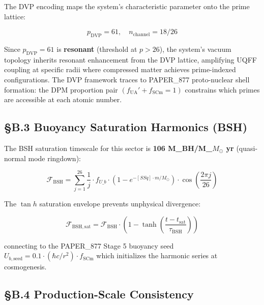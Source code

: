 \documentclass[12pt,a4paper]{article}
\begin{document}
The DVP encoding maps the system's characteristic parameter onto the prime lattice:

\begin{equation}
p_{\mathrm{DVP}} = 61, \quad n_{\mathrm{channel}} = 18/26
\end{equation}

Since $p_{\mathrm{DVP}} = 61$ is \textbf{resonant} (threshold at $p > 26$), the system's vacuum topology inherits resonant enhancement from the DVP lattice, amplifying UQFF coupling at specific radii where compressed matter achieves prime-indexed configurations. The DVP framework traces to PAPER\_877 proto-nuclear shell formation: the DPM proportion pair $(f_{\mathrm{UA}}' + f_{\mathrm{SCm}} = 1)$ constrains which primes are accessible at each atomic number.

\subsection{\S{}B.3 Buoyancy Saturation Harmonics (BSH)}

The BSH saturation timescale for this sector is \textbf{106 M\_BH/M\_{$M_{\odot}$} yr} (quasi-normal mode ringdown):

\begin{equation}
\mathcal{F}_{\mathrm{BSH}} = \sum_{j=1}^{26} \frac{1}{j} \cdot f_{U\_b} \cdot \left(1 - e^{-[SSq] \cdot m/M_\odot}\right) \cdot \cos\!\left(\frac{2\pi j}{26}\right)
\end{equation}

The $\tan h$ saturation envelope prevents unphysical divergence:

\begin{equation}
\mathcal{F}_{\mathrm{BSH,sat}} = \mathcal{F}_{\mathrm{BSH}} \cdot \left(1 - \tanh\!\left(\frac{t - t_{\mathrm{sat}}}{\tau_{\mathrm{BSH}}}\right)\right)
\end{equation}

connecting to the PAPER\_877 Stage 5 buoyancy seed $U_{b,\mathrm{seed}} = 0.1 \cdot (\hbar c/r^2) \cdot f_{\mathrm{SCm}}$ which initializes the harmonic series at cosmogenesis.

\subsection{\S{}B.4 Production-Scale Consistency}
\end{document}
